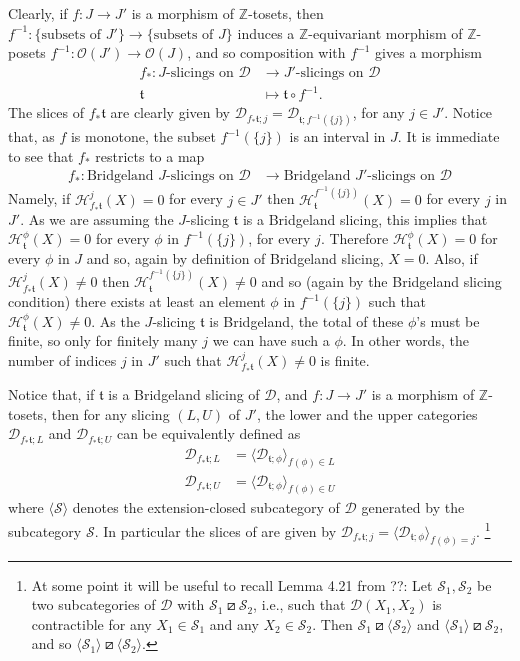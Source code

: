 \documentclass{article}
\theoremstyle{definition}
\newcommand{\Z}{\mathbb{Z}}
\newcommand{\Oo}{\mathcal{O}}
\newcommand{\tee}{\mathfrak{t}}
\newcommand{\orth}{\boxslash}
\begin{document}
Clearly, if $f\colon J\to J'$ is a morphism of $\Z$-tosets, then $f^{-1}\colon \{\text{subsets of $J'$}\}\to \{\text{subsets of $J$}\}$ induces a $\Z$-equivariant morphism of $\Z$-posets $f^{-1}\colon \Oo(J')\to \Oo(J)$, and so composition with $f^{-1}$ gives a morphism
\begin{align*}
f_*\colon J\text{-slicings on $\mathscr{D}$}&\to J'\text{-slicings on $\mathscr{D}$}\\
\tee&\mapsto \tee\circ f^{-1}.
\end{align*}
The slices of $f_*\tee$ are clearly given by $\mathscr{D}_{f_*\tee;j}=\mathscr{D}_{\tee;f^{-1}(\{j\})}$, for any $j\in J'$. Notice that, as $f$ is monotone, the subset $f^{-1}(\{j\})$ is an interval in $J$. It is immediate to see that $f_*$ restricts to a map
\begin{align*}
f_*\colon \text{Bridgeland $J$-slicings on $\mathscr{D}$}&\to \text{Bridgeland $J'$-slicings on $\mathscr{D}$}
\end{align*}
Namely, if $\mathcal{H}^j_{f_*\tee}(X)=0$ for every $j\in J'$ then $\mathcal{H}^{f^{-1}(\{j\})}_{\tee}(X)=0$ for every $j$ in $J'$. As we are assuming the $J$-slicing $\tee$ is a Bridgeland slicing, this implies that $\mathcal{H}^{\phi}_{\tee}(X)=0$ for every $\phi$ in $f^{-1}(\{j\})$, for every $j$. Therefore $\mathcal{H}^{\phi}_{\tee}(X)=0$ for every $\phi$ in $J$ and so, again by definition of Bridgeland slicing, $X=0$. Also, if $\mathcal{H}^j_{f_*\tee}(X)\neq 0$ then $\mathcal{H}^{f^{-1}(\{j\})}_{\tee}(X)\neq 0$ and so (again by the Bridgeland slicing condition) there exists at least an element $\phi$ in $f^{-1}(\{j\})$ such that $\mathcal{H}^{\phi}_{\tee}(X)\neq 0$. As the $J$-slicing $\tee$ is Bridgeland, the total of these $\phi$'s must be finite, so only for finitely many $j$ we can have such a $\phi$. In other words, the number of indices $j$ in $J'$ such that $\mathcal{H}^j_{f_*\tee}(X)\neq 0$ is finite.

Notice that, if $\tee$ is a Bridgeland slicing of $\mathscr{D}$, and $f\colon J\to J'$ is a morphism of $\Z$-tosets, then for any slicing $(L,U)$ of $J'$, the lower and the upper categories
$\mathscr{D}_{f_*\tee;L}$ and $\mathscr{D}_{f_*\tee;U}$ can be equivalently defined as
\begin{align*}
\mathscr{D}_{f_*\tee;L}&=\langle \mathscr{D}_{\tee;\phi}\rangle_{f(\phi)\in L}\\
\mathscr{D}_{f_*\tee;U}&=\langle \mathscr{D}_{\tee;\phi}\rangle_{f(\phi)\in U}
\end{align*}
where $\langle \mathscr{S}\rangle$ denotes the extension-closed subcategory of $\mathscr{D}$ generated by the subcategory $\mathscr{S}$. In particular the slices of are given by 
$\mathscr{D}_{f_*\tee;j}=\langle \mathscr{D}_{\tee;\phi}\rangle_{f(\phi)=j}$.
\footnote{
At some point it will be useful to recall Lemma 4.21 from ??:
Let $\mathscr{S}_1,\mathscr{S}_2$ be two subcategories of $\mathscr{D}$ with $\mathscr{S}_1\orth \mathscr{S}_2$, i.e., such that $\mathscr{D}(X_1,X_2)$ is contractible for any $X_1\in \mathscr{S}_1$ and any $X_2\in\mathscr{S}_2$. Then $\mathscr{S}_1\orth \langle\mathscr{S}_2\rangle$ and $\langle\mathscr{S}_1\rangle\orth \mathscr{S}_2$, and so $\langle\mathscr{S}_1\rangle\orth \langle\mathscr{S}_2\rangle$.}
\end{document}
